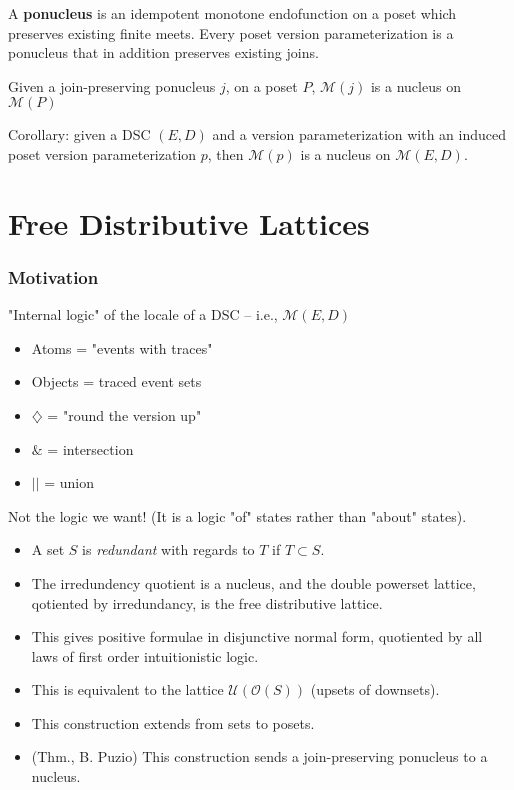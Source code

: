 \documentclass{beamer}
\newcommand{\Mcc}{\mathcal{M}}
\newcommand{\Oc}{\mathcal{O}}
\newcommand{\Ucc}{\mathcal{U}}
\newcommand{\Dia}{\diamondsuit}
\begin{document}
\begin{frame}

\begin{lemma}
A \textbf{ponucleus} is an idempotent monotone endofunction on a poset which preserves existing finite meets.
Every poset version parameterization is a ponucleus that in addition preserves existing joins.
\end{lemma}

\begin{theorem}
Given a join-preserving ponucleus \(j\), on a poset \(P\),  \(\Mcc(j)\) is a nucleus on \(\Mcc(P)\)
\end{theorem}

Corollary: given a DSC \((E,D)\) and a version parameterization with an induced poset version parameterization \(p\), then \(\Mcc(p)\) is a nucleus on \(\Mcc(E,D)\).
\end{frame}

\section{Free Distributive Lattices}
\begin{frame}
\frametitle{Motivation}
"Internal logic" of the locale of a DSC  -- i.e., \(\Mcc(E,D)\)
\begin{itemize}
\item Atoms = "events with traces"
\item Objects = traced event sets
\item \(\Dia\) =  "round the version up"
\item \(\&\) = intersection
\item \(||\) = union
\end{itemize}

Not the logic we want! (It is a logic "of" states rather than "about" states).
\end{frame}

\begin{frame}
\begin{itemize}
\item A set \(S\) is \textit{redundant} with regards to \(T\) if \(T \subset S\). 
\item The irredundency quotient is a nucleus, and the double powerset lattice, qotiented by irredundancy, is the free distributive lattice. 
\item This gives positive formulae in disjunctive normal form, quotiented by all laws of first order intuitionistic logic.
\item This is equivalent to the lattice \(\Ucc(\Oc(S))\) (upsets of downsets).
\item This construction extends from sets to posets.
\item (Thm., B. Puzio) This construction sends a join-preserving ponucleus to a nucleus.
\end{itemize}
\end{frame}
\end{document}
